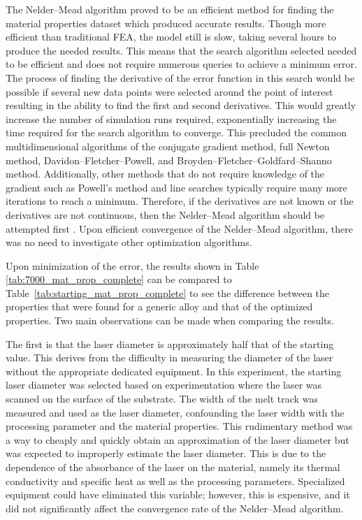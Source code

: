 \documentclass[metals,article,accept,pdftex,moreauthors]{Definitions/mdpi}
\begin{document}
The Nelder--Mead algorithm proved to be an efficient method for finding the material 
properties dataset which produced accurate results.  Though more efficient than 
traditional \ac{FEA}, the model still is slow, taking several hours to produce the needed 
results.  This means that the search algorithm selected needed to be efficient and does not 
require numerous queries to achieve a minimum error.  The process of finding the 
derivative of the error function in this search would be possible if several new data points 
were selected around the point of interest resulting in the ability to find the first and 
second derivatives.  This would greatly increase the number of simulation runs required, 
exponentially increasing the time required for the search algorithm to converge.  This 
precluded the common multidimensional algorithms of the conjugate gradient method, 
full Newton method, Davidon--Fletcher--Powell, and 
Broyden--Fletcher--Goldfard--Shanno method.  Additionally, other methods that do not 
require knowledge of the gradient such as Powell's method and line searches typically 
require many more iterations to reach a minimum.  %
Therefore, if the derivatives are not known or the derivatives are not continuous, then the 
Nelder--Mead algorithm should be attempted first	\cite{extremeoptimization}.  Upon 
efficient convergence of the Nelder--Mead algorithm, there was no need to investigate 
other optimization algorithms.

Upon minimization of the error, the results shown in Table \ref{tab:7000_mat_prop_complete} can be compared to \mbox{Table \ref{tab:starting_mat_prop_complete}} to see the difference between the properties that were found for a generic 
alloy and that of the optimized properties.  Two main observations can be made when comparing the results.


The first is that the laser diameter is approximately half that of the starting value.  This 
derives from the difficulty in measuring the diameter of the laser without the appropriate 
dedicated equipment.  In this experiment, the starting laser diameter was selected based 
on experimentation where the laser was scanned on the surface of the substrate.  The 
width of the melt track was measured and used as the laser diameter, confounding the 
laser width with the processing parameter and the material properties.  This rudimentary 
method was a way to cheaply and quickly obtain an approximation of the laser diameter 
but was expected to improperly estimate the laser diameter.  This is due to the dependence 
of the absorbance of the laser on the material, namely its thermal conductivity and specific 
heat as well as the processing parameters.  Specialized equipment could have eliminated 
this variable; however, this is expensive, and it did not significantly affect the convergence 
rate of the Nelder--Mead algorithm.  
\end{document}
